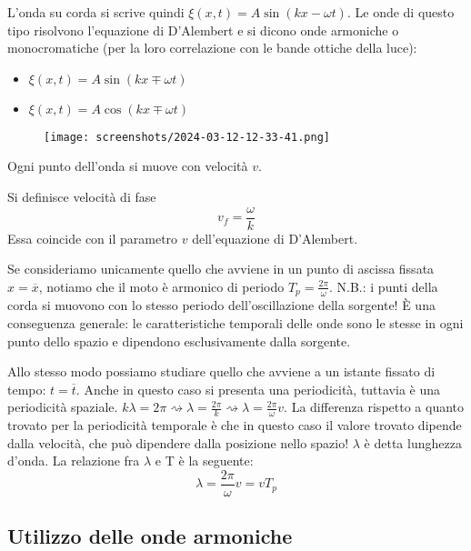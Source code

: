 L'onda su corda si scrive quindi \(\xi (x,t) = A \sin (kx - \omega t)\). Le onde di questo tipo risolvono l'equazione di D'Alembert e si dicono onde armoniche o monocromatiche (per la loro correlazione con le bande ottiche della luce):
\begin{itemize}
	\item \(\xi (x,t) = A \sin (kx \mp \omega t)\)
	\item \(\xi (x,t) = A \cos (kx \mp \omega t)\)  
\end{itemize}
\begin{figure}[H]
	\centering
	\texttt{[image: screenshots/2024-03-12-12-33-41.png]}
\end{figure}
Ogni punto dell'onda si muove con velocità \(v\).
\begin{definition}
	Si definisce velocità di fase
	\[
		v_f = \frac{\omega }{k}
	\]
	Essa coincide con il parametro \(v\) dell'equazione di D'Alembert.
\end{definition}
Se consideriamo unicamente quello che avviene in un punto di ascissa fissata \(x=\overline{x} \), notiamo che il moto è armonico di periodo \(T_p = \frac{2\pi }{\omega }\). N.B.: i punti della corda si muovono con lo stesso periodo dell'oscillazione della sorgente! È una conseguenza generale: le caratteristiche temporali delle onde sono le stesse in ogni punto dello spazio e dipendono esclusivamente dalla sorgente.

Allo stesso modo possiamo studiare quello che avviene a un istante fissato di tempo: \(t=\overline{t} \). Anche in questo caso si presenta una periodicità, tuttavia è una periodicità spaziale. \(k \lambda = 2\pi \rightsquigarrow \lambda = \frac{2\pi }{k} \rightsquigarrow \lambda = \frac{2 \pi }{\omega } v\). La differenza rispetto a quanto trovato per la periodicità temporale è che in questo caso il valore trovato dipende dalla velocità, che può dipendere dalla posizione nello spazio! \(\lambda \) è detta lunghezza d'onda. La relazione fra \(\lambda \) e T è la seguente:
\[
	\lambda = \frac{2\pi }{\omega }v= vT_p
\]

\subsection{Utilizzo delle onde armoniche}

